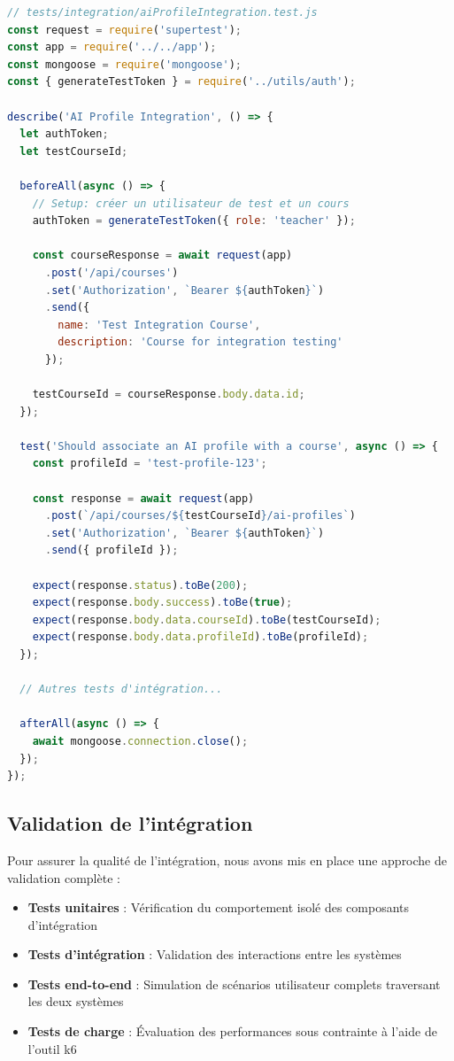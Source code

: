 \begin{lstlisting}[style=codestyle, language=JavaScript]
// tests/integration/aiProfileIntegration.test.js
const request = require('supertest');
const app = require('../../app');
const mongoose = require('mongoose');
const { generateTestToken } = require('../utils/auth');

describe('AI Profile Integration', () => {
  let authToken;
  let testCourseId;
  
  beforeAll(async () => {
    // Setup: créer un utilisateur de test et un cours
    authToken = generateTestToken({ role: 'teacher' });
    
    const courseResponse = await request(app)
      .post('/api/courses')
      .set('Authorization', `Bearer ${authToken}`)
      .send({
        name: 'Test Integration Course',
        description: 'Course for integration testing'
      });
      
    testCourseId = courseResponse.body.data.id;
  });
  
  test('Should associate an AI profile with a course', async () => {
    const profileId = 'test-profile-123';
    
    const response = await request(app)
      .post(`/api/courses/${testCourseId}/ai-profiles`)
      .set('Authorization', `Bearer ${authToken}`)
      .send({ profileId });
      
    expect(response.status).toBe(200);
    expect(response.body.success).toBe(true);
    expect(response.body.data.courseId).toBe(testCourseId);
    expect(response.body.data.profileId).toBe(profileId);
  });
  
  // Autres tests d'intégration...
  
  afterAll(async () => {
    await mongoose.connection.close();
  });
});
\end{lstlisting}

\subsection{Validation de l'intégration}

Pour assurer la qualité de l'intégration, nous avons mis en place une approche de validation complète :

\begin{itemize}
  \item \textbf{Tests unitaires} : Vérification du comportement isolé des composants d'intégration
  
  \item \textbf{Tests d'intégration} : Validation des interactions entre les systèmes
  
  \item \textbf{Tests end-to-end} : Simulation de scénarios utilisateur complets traversant les deux systèmes
  
  \item \textbf{Tests de charge} : Évaluation des performances sous contrainte à l'aide de l'outil k6
\end{itemize}

